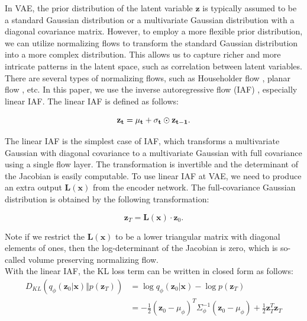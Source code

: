 \documentclass[10pt]{article}
\begin{document}
In VAE, the prior distribution of the latent variable $\mathbf{z}$ is typically assumed to be a standard Gaussian distribution or a multivariate Gaussian distribution with a diagonal covariance matrix. \cite{kingma2013auto} However, to employ a more flexible prior distribution, we can utilize normalizing flows to transform the standard Gaussian distribution into a more complex distribution. This allows us to capture richer and more intricate patterns in the latent space, such as correlation between latent variables.\\

There are several types of normalizing flows, such as Householder flow \cite{tomczak2017householder}, planar flow \cite{rezende15normalizingflows}, etc. In this paper, we use the inverse autoregressive flow (IAF) \cite{kingma2016iaf}, especially linear IAF. The linear IAF is defined as follows:

\begin{equation}
    \bf z_t = \bf \mu_t + \bf \sigma_t \odot \bf z_{t-1}.
\end{equation}

The linear IAF is the simplest case of IAF, which transforms a multivariate Gaussian with diagonal covariance to a multivariate Gaussian with full covariance using a single flow layer. The transformation is invertible and the determinant of the Jacobian is easily computable. To use linear IAF at VAE, we need to produce an extra output $\mathbf{L(x)}$ from the encoder network. The full-covariance Gaussian distribution is obtained by the following transformation:

\begin{equation}
    \mathbf{z}_T = \mathbf{L(x)} \cdot \mathbf{z}_0.
\end{equation}

Note if we restrict the $\mathbf{L(x)}$ to be a lower triangular matrix with diagonal elements of ones, then the log-determinant of the Jacobian is zero, which is so-called volume preserving normalizing flow. \cite{kingma2016iaf}\\

With the linear IAF, the KL loss term can be written in closed form as follows:
\begin{equation}
    \begin{aligned}
        D_{KL}(q_\phi(\mathbf{z}_0 | \mathbf{x}) \Vert p(\mathbf{z}_T)) &=
        \log q_\phi(\mathbf{z}_0 | \mathbf{x}) - \log p(\mathbf{z}_T) \\
        &= -\frac{1}{2}(\mathbf{z}_0 -\mu_\phi)^T\Sigma_\phi^{-1}(\mathbf{z}_0 -\mu_\phi) + \frac{1}{2}\mathbf{z}_T^T\mathbf{z}_T \\
    \end{aligned}
\end{equation}
\end{document}
